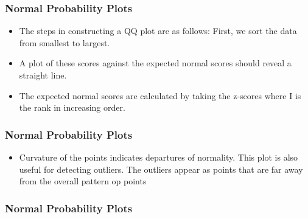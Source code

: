 \documentclass{beamer}
\begin{document}
\begin{frame}
\frametitle{Normal Probability Plots}
\Large
\begin{itemize}
\item The steps in constructing a QQ plot are as follows: First, we sort the data from smallest to largest. 
\item A plot of these scores against the expected normal scores should reveal a straight line. \item The expected normal scores are calculated by taking the z-scores  where I is the rank in increasing order.
\end{itemize}
\end{frame}
\begin{frame}
\frametitle{Normal Probability Plots}
\Large
\begin{itemize}

\item Curvature of the points indicates departures of normality. This plot is also useful for detecting outliers. The outliers appear as points that are far away from the overall pattern op points
\end{itemize}
\end{frame}
\begin{frame}
\frametitle{Normal Probability Plots}

\end{frame}
\end{document}

